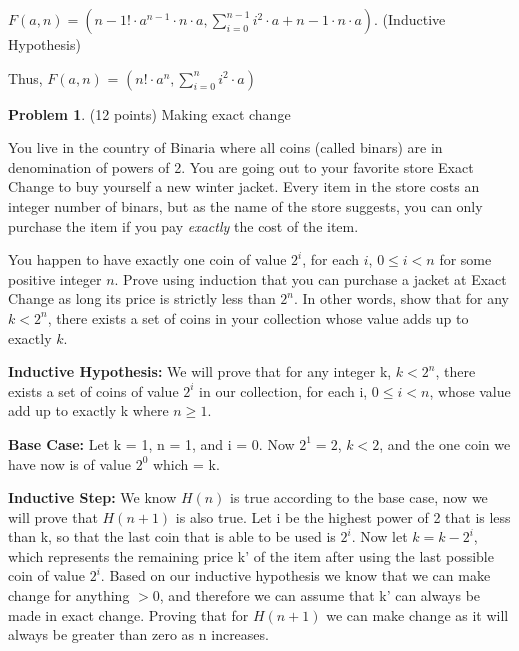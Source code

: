 \documentclass[11pt]{article}
\theoremstyle{definition}
\theoremstyle{theorem}
\newtheorem{prob}{Problem}
\begin{document}
\newpage
\begin{center}
$F(a,n) = (n-1! \cdot a^{n-1} \cdot n \cdot a, \sum_{i=0}^{n-1} i^{2} \cdot a + n-1 \cdot n \cdot a)$. (Inductive Hypothesis)\\
\end{center}
\begin{center}
Thus, $F(a, n)$ = $(n! \cdot a^n, \sum_{i=0}^{n} i^{2} \cdot a)$ \checkmark
\end{center}
\newpage

\begin{prob}
  (12 points) Making exact change
\end{prob}

You live in the country of Binaria where all coins (called binars) are
in denomination of powers of 2.  You are going out to your favorite
store Exact Change to buy yourself a new winter jacket.  Every item in
the store costs an integer number of binars, but as the name of the
store suggests, you can only purchase the item if you pay {\em
  exactly}\/ the cost of the item.

You happen to have exactly one coin of value $2^i$, for each $i$, $0
\le i < n$ for some positive integer $n$.  Prove using induction that
you can purchase a jacket at Exact Change as long its price is
strictly less than $2^n$.  In other words, show that for any $k <
2^n$, there exists a set of coins in your collection whose value adds
up to exactly $k$.

\begin{flushleft}
\textbf{Inductive Hypothesis:} We will prove that for any integer k, $k < 2^n$, there exists a set of coins of value $2^i$ in our collection, for each i, $0 \leq i < n$, whose value add up to exactly k where $n \geq 1$.
\end{flushleft}
\begin{flushleft}
\textbf{Base Case:} Let k = 1, n = 1, and i = 0. Now $2^1 = 2$, $k < 2$, and the one coin we have now is of value $2^0$ which = k. \checkmark
\end{flushleft}
\begin{flushleft}
\textbf{Inductive Step:} We know $H(n)$ is true according to the base case, now we will prove that $H(n+1)$ is also true. Let i be the highest power of 2 that is less than k, so that the last coin that is able to be used is $2^i$. Now let $k = k - 2^i$, which represents the remaining price k' of the item after using the last possible coin of value $2^i$. Based on our inductive hypothesis we know that we can make change for anything $> 0$, and therefore we can assume that k' can always be made in exact change. Proving that for $H(n+1)$ we can make change as it will always be greater than zero as n increases. 
 
\end{flushleft}
\end{document}
